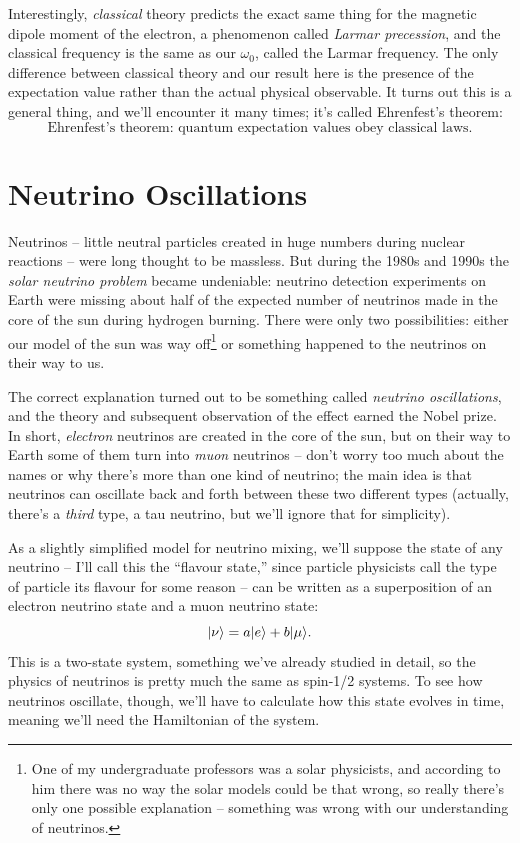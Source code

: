 Interestingly, \emph{classical} theory predicts the exact same thing for the magnetic dipole moment of the electron, a phenomenon called \emph{Larmar precession}, and the classical frequency is the same as our $\omega_0$, called the Larmar frequency.  The only difference between classical theory and our result here is the presence of the expectation value rather than the actual physical observable.  It turns out this is a general thing, and we'll encounter it many times; it's called Ehrenfest's theorem:
\[
\boxed{
\text{Ehrenfest's theorem:  quantum expectation values obey classical laws.}
}
\]


%
%
%

\section{Neutrino Oscillations}

Neutrinos -- little neutral particles created in huge numbers during nuclear reactions -- were long thought to be massless.  But during the 1980s and 1990s the \emph{solar neutrino problem} became undeniable: neutrino detection experiments on Earth were missing about half of the expected number of neutrinos made in the core of the sun during hydrogen burning.  There were only two possibilities:  either our model of the sun was way off\footnote{One of my undergraduate professors was a solar physicists, and according to him there was no way the solar models could be that wrong, so really there's only one possible explanation -- something was wrong with our understanding of neutrinos.} or something happened to the neutrinos on their way to us.

The correct explanation turned out to be something called \emph{neutrino oscillations}, and the theory and subsequent observation of the effect earned the Nobel prize.  In short, \emph{electron} neutrinos are created in the core of the sun, but on their way to Earth some of them turn into \emph{muon} neutrinos -- don't worry too much about the names or why there's more than one kind of neutrino; the main idea is that neutrinos can oscillate back and forth between these two different types (actually, there's a \emph{third} type, a tau neutrino, but we'll ignore that for simplicity).

As a slightly simplified model for neutrino mixing, we'll suppose the state of any neutrino -- I'll call this the ``flavour state,'' since particle physicists call the type of particle its flavour for some reason -- can be written as a superposition of an electron neutrino state and a muon neutrino state:
\begin{equation}
| \nu \rangle = a | e \rangle + b | \mu \rangle.
\end{equation}
This is a two-state system, something we've already studied in detail, so the physics of neutrinos is pretty much the same as spin-1/2 systems.  To see how neutrinos oscillate, though, we'll have to calculate how this state evolves in time, meaning we'll need the Hamiltonian of the system.

